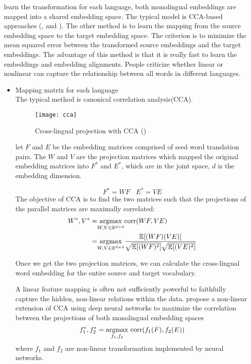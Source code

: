 learn the transformation for each language, both monolingual embeddings are mapped into a shared embedding space. The typical model is CCA-based approaches (\cite{faruqui2014improving}, \cite{dhillon2011multi} and \cite{lu2015deep}). The other method is to learn the mapping from the source embedding space to the target embedding space. The criterion is to minimize the mean squared error between the transformed source embeddings and the target embeddings. The advantage of this method is that it is really fast to learn the embeddings and embedding alignments. People criticize whether linear or nonlinear can capture the relationship between all words in different languages.
\begin{itemize}
	\item Mapping matrix for each language\\
	The typical method is  canonical correlation analysis(CCA).
	\begin{figure}[t]
		\texttt{[image: cca]}
		\centering
		\caption{Cross-lingual projection with CCA (\cite{faruqui2014improving})}
	\end{figure}
	let $F $ and $E$ be the embedding matrices comprised of seed word translation pairs. The  $W$ and $V$ are the projection matrices which mapped the original embedding matrices into $F^{*}$ and $E^{*}$, which are in the joint space, $d$ is the embedding dimension.
	
	\[ {F}^{*} = W{F} \ \ \ \  {E}^{*} = V{E} \] 
	The objective of CCA is to find the two matrices such that the projections of the parallel matrices are maximally correlated:
	\begin{align}
		W^*, V^* =& \underset{W, V \in \mathbb{R}^{d \times d}}{\operatorname{argmax}} \text{corr}(WF, VE)\\
		= &\underset{W, V \in \mathbb{R}^{d \times d}}{\operatorname{argmax}} \frac{\mathbb{E}[(W{F})(V{E})]}{\sqrt{\mathbb{E}[(W{F})^2]} \sqrt{\mathbb{E}[( V{E})^2]}}
	\end{align}

	Once we get the two projection matrices, we can calculate the cross-lingual word embedding for the entire source and target vocabulary.
	
	A linear feature mapping is often not sufficiently powerful to faithfully capture the hidden, non-linear relations within the data. \cite{lu2015deep} propose a non-linear extension of CCA using deep neural networks to maximize the
	correlation between the projections of both monolingual embedding spaces
	\[ f_1^*, f_2^* = \argmax{f_1, f_2} \ \text{corr}(f_1(F), f_2(E)) \]
	where $f_1$ and $f_2$ are non-linear transformation implemented by neural networks.
	

\end{itemize}
